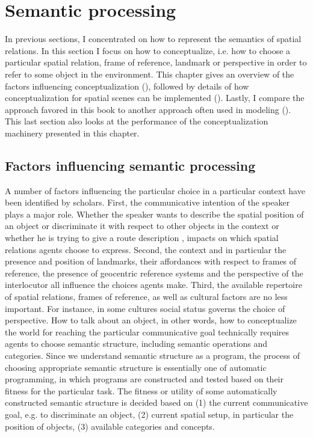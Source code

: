 % 
% 

\chapter{Semantic processing}
\label{s:german-locative-phrases-semantic-processing}

In previous sections, I concentrated on how to represent the semantics
of spatial relations. In this section I focus on how to conceptualize, 
i.e. how to choose a particular spatial relation, frame of 
reference, landmark or perspective in order to refer to some object
in the environment. This chapter gives an overview of the factors
influencing conceptualization (),
followed by details of how conceptualization for spatial scenes can
be implemented (). Lastly, I compare the approach favored in this
book to another approach often used in modeling 
(). This last 
section also looks at the performance of the conceptualization
machinery presented in this chapter.


\section{Factors influencing semantic processing}
\label{s:factors-of-conceptualization}
A number of factors influencing the particular
choice in a particular context have been identified by scholars. 
First, the communicative intention of the speaker plays a major role. 
Whether the speaker wants to describe the spatial position of an 
object or discriminate it with respect to other objects in the context or whether
he is trying to give a route description \citep{tversky1998space},
impacts on which spatial relations agents choose to express.
Second, the context and in particular the presence and position of landmarks,
their affordances with respect to frames of reference, the presence
of geocentric reference systems and the perspective of the interlocutor 
all influence the choices agents make.
Third, the available repertoire of spatial relations, frames of reference,
as well as cultural factors are no less important. For instance, in some cultures 
social status governs the choice of perspective.
How to talk about an object, in other words, how to conceptualize
the world for reaching the particular communicative goal
technically requires agents to choose semantic structure, 
including semantic operations and categories. 
Since we understand semantic structure as a program, the process 
of choosing appropriate semantic structure is essentially one of 
automatic programming, in which programs are constructed and 
tested based on their fitness for the particular task. 
The fitness or utility of some automatically constructed semantic structure 
is decided based on (1) the current communicative goal, e.g. to discriminate an object, 
(2) current spatial setup, in particular the position of objects,
(3) available categories and concepts.


